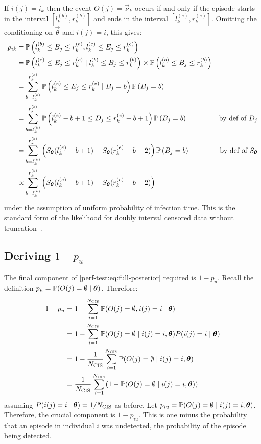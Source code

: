 \documentclass[thesis.tex]{subfiles}
\begin{document}
If $i(j) = i_k$ then the event $O(j) = \vec{\nu}_k$ occurs if and only if the episode starts in the interval $[l^{(b)}_k, r^{(b)}_k]$ and ends in the interval $[l^{(e)}_k, r^{(e)}_k]$.
Omitting the conditioning on $\vec{\theta}$ and $i(j) = i$, this gives:
\begin{align}
p_{ik}
=& \operatorname{\mathbb{P}} \left( l_k^{(b)} \leq B_{j} \leq r_k^{(b)}, l_k^{(e)} \leq E_{j} \leq r_k^{(e)} \right) \\
=& \operatorname{\mathbb{P}} \left( l_k^{(e)} \leq E_{j} \leq r_k^{(e)} \mid l_k^{(b)} \leq B_{j} \leq r_k^{(b)} \right) \times\operatorname{\mathbb{P}} \left( l_k^{(b)} \leq B_{j} \leq r_k^{(b)} \right) \\
=& \sum_{b = l_k^{(b)}}^{r_k^{(b)}} \operatorname{\mathbb{P}} \left( l_k^{(e)} \leq E_{j} \leq r_k^{(e)} \mid B_{j} = b \right) \operatorname{\mathbb{P}} \left(B_{j} = b \right) \\
=& \sum_{b = l_k^{(b)}}^{r_k^{(b)}} \operatorname{\mathbb{P}} \left( l_k^{(e)} - b + 1 \leq D_{j} \leq r_k^{(e)} - b + 1 \right) \operatorname{\mathbb{P}} \left(B_{j} = b \right) &\text{by def of $D_{j}$} \\
=& \sum_{b = l_k^{(b)}}^{r_k^{(b)}} \left( S_{\bm{\theta}}(l_k^{(e)} - b + 1) - S_{\bm{\theta}}(r_k^{(e)} - b + 2) \right) \operatorname{\mathbb{P}} \left(B_{j} = b \right) &\text{by def of $S_{\bm{\theta}}$} \\
\propto& \sum_{b = l_k^{(b)}}^{r_k^{(b)}} \left( S_{\bm{\theta}}(l_k^{(e)} - b + 1) - S_{\bm{\theta}}(r_k^{(e)} - b + 2) \right)
\label{perf-test:eq:pia}
\end{align}
under the assumption of uniform probability of infection time.
This is the standard form of the likelihood for doubly interval censored data without truncation~\autocite[e.g.][]{sunEmpirical}.

\subsection{Deriving $1 - p_u$} \label{perf-test:sec:prob-undetected}

The final component of \cref{perf-test:eq:full-posterior} required is $1 - p_u$.
Recall the definition $p_u = \operatorname{\mathbb{P}}(O(j) = \emptyset \mid \bm{\theta})$.
Therefore:
\begin{align}
  1 - p_u
  &= 1 - \sum_{i=1}^{N_\text{CIS}} \operatorname{\mathbb{P}}(O(j) = \emptyset, i(j) = i \mid \bm{\theta}) \\
  &= 1 - \sum_{i=1}^{N_\text{CIS}} \operatorname{\mathbb{P}}(O(j) = \emptyset \mid i(j) = i, \bm{\theta}) P(i(j) = i \mid \bm{\theta}) \\
  &= 1 - \frac{1}{N_\text{CIS}}\sum_{i=1}^{N_\text{CIS}} \operatorname{\mathbb{P}}(O(j) = \emptyset \mid i(j) = i, \bm{\theta}) \\
  &= \frac{1}{N_\text{CIS}} \sum_{i=1}^{N_\text{CIS}} (1 - \operatorname{\mathbb{P}}(O(j) = \emptyset \mid i(j) = i, \bm{\theta}))
  \label{perf-test:eq:pu}
\end{align}
assuming $P(i(j) = i \mid \bm{\theta}) = 1/N_\text{CIS}$ as before.
Let $p_{iu} = \operatorname{\mathbb{P}}(O(j) = \emptyset \mid i(j) = i, \bm{\theta})$.
Therefore, the crucial component is $1 - p_{iu}$.
This is one minus the probability that an episode in individual $i$ was undetected, \ie the probability of the episode being detected.
\end{document}
